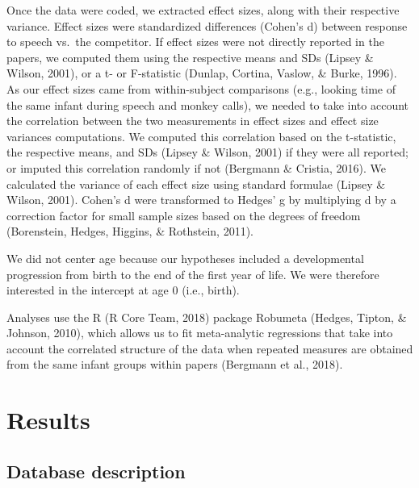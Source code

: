 \documentclass[
  man,mask,floatsintext]{apa6}
\begin{document}
Once the data were coded, we extracted effect sizes, along with their respective variance. Effect sizes were standardized differences (Cohen's d) between response to speech vs.~the competitor.
If effect sizes were not directly reported in the papers, we computed them using the respective means and SDs (Lipsey \& Wilson, 2001), or a t- or F-statistic (Dunlap, Cortina, Vaslow, \& Burke, 1996). As our effect sizes came from within-subject comparisons (e.g., looking time of the same infant during speech and monkey calls), we needed to take into account the correlation between the two measurements in effect sizes and effect size variances computations. We computed this correlation based on the t-statistic, the respective means, and SDs (Lipsey \& Wilson, 2001) if they were all reported; or imputed this correlation randomly if not (Bergmann \& Cristia, 2016). We calculated the variance of each effect size using standard formulae (Lipsey \& Wilson, 2001). Cohen's d were transformed to Hedges' g by multiplying d by a correction factor for small sample sizes based on the degrees of freedom (Borenstein, Hedges, Higgins, \& Rothstein, 2011).

We did not center age because our hypotheses included a developmental progression from birth to the end of the first year of life. We were therefore interested in the intercept at age 0 (i.e., birth).

Analyses use the R (R Core Team, 2018) package Robumeta (Hedges, Tipton, \& Johnson, 2010), which allows us to fit meta-analytic regressions that take into account the correlated structure of the data when repeated measures are obtained from the same infant groups within papers (Bergmann et al., 2018).

\hypertarget{results}{%
\section{Results}\label{results}}

\hypertarget{database-description}{%
\subsection{Database description}\label{database-description}}
\end{document}
